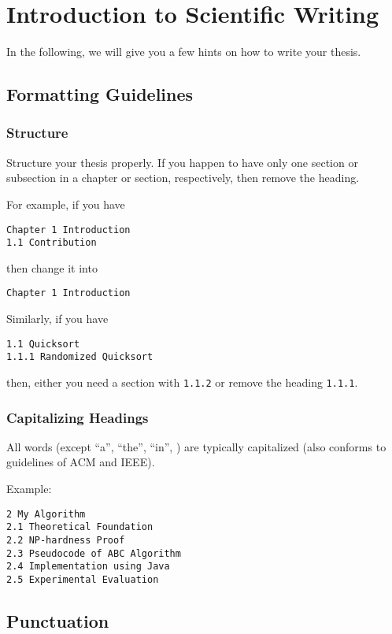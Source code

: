 


\chapter{Introduction to Scientific Writing}

In the following, we will give you a few hints on how to write your
thesis.

\section{Formatting Guidelines}

\subsection{Structure}
Structure your thesis properly. If you happen to have only one section
or subsection in a chapter or section, respectively, then remove the
heading.

For example, if you have
\begin{lstlisting}
Chapter 1 Introduction
1.1 Contribution
\end{lstlisting}
then change it into
\begin{lstlisting}
Chapter 1 Introduction
\end{lstlisting}

Similarly, if you have
\begin{lstlisting}
1.1 Quicksort
1.1.1 Randomized Quicksort
\end{lstlisting}
then, either you need a section with \verb|1.1.2| or remove the
heading \verb|1.1.1|.

\subsection{Capitalizing Headings}

All words (except ``a'', ``the'', ``in'', \etcet) are typically
capitalized (also conforms to guidelines of ACM and IEEE).

Example:
\begin{verbatim}
2 My Algorithm
2.1 Theoretical Foundation
2.2 NP-hardness Proof
2.3 Pseudocode of ABC Algorithm
2.4 Implementation using Java
2.5 Experimental Evaluation
\end{verbatim}

\section{Punctuation}

